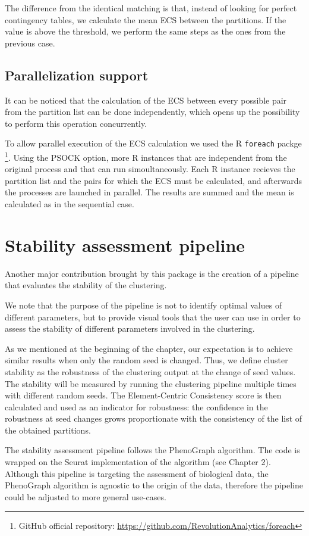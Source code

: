 The difference from the identical matching is that, instead of looking for perfect contingency tables, we calculate the mean ECS between the partitions. If the value is above the threshold, we perform the same steps as the ones from the previous case.

\subsection{Parallelization support} \label{sec:paral}
It can be noticed that the calculation of the ECS between every possible pair from the partition list can be done independently, which opens up the possibility to perform this operation concurrently.

To allow parallel execution of the ECS calculation we used the R \verb|foreach| packge \footnote{GitHub official repository: \url{https://github.com/RevolutionAnalytics/foreach}}. Using the PSOCK option, more R instances that are independent from the original process and that can run simoultaneously. Each R instance recieves the partition list and the pairs for which the ECS must be calculated, and afterwards the processes are launched in parallel. The results are summed and the mean is calculated as in the sequential case.

\section{Stability assessment pipeline}
Another major contribution brought by this package is the creation of a pipeline that evaluates the stability of the clustering.

We note that the purpose of the pipeline is not to identify optimal values of different parameters, but to provide visual tools that the user can use in order to assess the stability of different parameters involved in the clustering.

As we mentioned at the beginning of the chapter, our expectation is to achieve similar results when only the random seed is changed. Thus, we define cluster stability as the robustness of the clustering output at the change of seed values. The stability will be measured by running the clustering pipeline multiple times with different random seeds. The Element-Centric Consistency score is then calculated and used as an indicator for robustness: the confidence in the robustness at seed changes grows proportionate with the consistency of the list of the obtained partitions.

The stability assessment pipeline follows the PhenoGraph \cite{Levine2015} algorithm. The code is wrapped on the Seurat implementation of the algorithm (see Chapter 2). Although this pipeline is targeting the assessment of biological data, the PhenoGraph algorithm is agnostic to the origin of the data, therefore the pipeline could be adjusted to more general use-cases.

